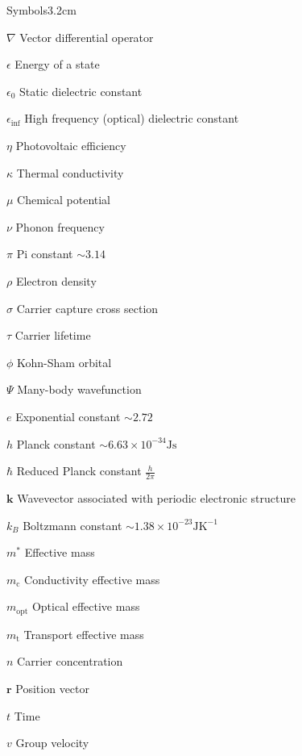 \begin{mclistof}{Symbols}{3.2cm}

\item[$\nabla$] Vector differential operator
\item[$\epsilon$] Energy of a state
\item[$\epsilon_0$] Static dielectric constant
\item[$\epsilon_{\inf}$] High frequency (optical) dielectric constant 
\item[$\eta$] Photovoltaic efficiency
\item[$\kappa$] Thermal conductivity
\item[$\mu$] Chemical potential
\item[$\nu$] Phonon frequency
\item[$\pi$] Pi constant $\sim 3.14$
\item[$\rho$] Electron density
\item[$\sigma$] Carrier capture cross section
\item[$\tau$] Carrier lifetime
\item[$\phi$] Kohn-Sham orbital

\vspace{\frontmatterbaselineskip}

\item[$\Psi$] Many-body wavefunction

\vspace{\frontmatterbaselineskip}

\item[$e$] Exponential constant $\sim 2.72$
\item[$h$] Planck constant $\sim 6.63\times10^{-34}\textrm{Js}$
\item[$\hbar$] Reduced Planck constant $\frac{h}{2\pi}$ 
\item[$\textbf{k}$] Wavevector associated with periodic electronic structure
\item[$k_B$] Boltzmann constant $\sim 1.38\times10^{-23}\textrm{JK}^{-1}$
\item[$m^*$] Effective mass
\item[$m_\textrm{c}$] Conductivity effective mass
\item[$m_\textrm{opt}$] Optical effective mass
\item[$m_\textrm{t}$] Transport effective mass
\item[$n$] Carrier concentration
\item[$\textbf{r}$] Position vector
\item[$t$] Time
\item[$v$] Group velocity


\end{mclistof}
